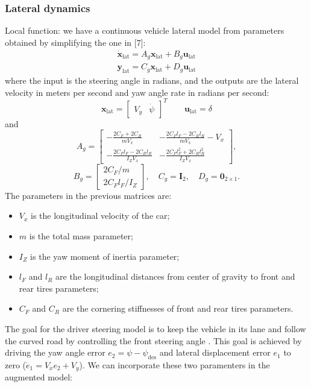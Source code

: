 \documentclass[conference, 11pt]{IEEEtran}
\begin{document}
\subsubsection{Lateral dynamics}
Local function: we have a continuous vehicle lateral model from parameters obtained by simplifying the one in [7]: 
\begin{equation}
\label{eqn:lateral_dynamics_simple_model}
\begin{array}{ll}
\dot{\textbf{x}}_{\text{lat}} =A_g \textbf{x}_{\text{lat}}+ B_g \textbf{u}_{\text{lat}}\\
\textbf{y}_{\text{lat}} =C_g \textbf{x}_{\text{lat}} + D_g \textbf{u}_{\text{lat}}
\end{array}
\end{equation}
where the input is the steering angle in radians, and the outputs are the lateral velocity in meters per second and yaw angle rate in radians per second:
\begin{equation*}
\textbf{x}_{\text{lat}} = \begin{bmatrix}
V_y&\dot{\psi}
\end{bmatrix}^T
\qquad
\textbf{u}_{\text{lat}} = \delta
\end{equation*}
and
\[ 
A_g=\begin{bmatrix}
-\frac{2C_F+2C_R}{mV_x}&-\frac{2C_Fl_F-2C_Rl_R}{mV_x} - V_x\\
-\frac{2C_Fl_F-2C_Rl_R}{I_ZV_x}&-\frac{2C_Fl_F^2+2C_Rl_R^2}{I_ZV_x}
\end{bmatrix},
\]
\[
B_g=\begin{bmatrix}
2C_F/m\\
2C_Fl_F/I_Z
\end{bmatrix},
\quad
C_g=\textbf{I}_2, 
\quad
D_g=\textbf{0}_{2\times1}.
\]
The parameters in the previous matrices are:
\begin{itemize}
	\item $V_x$ is the longitudinal velocity of the car;	
	\item $m$ is the total mass parameter; 
	\item $I_Z$ is the yaw moment of inertia parameter;
	\item $l_F$ and $l_R$ are the longitudinal distances from center of gravity to front and rear tires parameters;
	\item $C_F$ and $C_R$ are the cornering stiffnesses of front and rear tires parameters.
\end{itemize}
The goal for the driver steering model is to keep the vehicle in its lane and follow the curved road by controlling the front steering angle . This goal is achieved by driving the yaw angle error $e_2 = \psi -\psi_{\text{des}}$ and lateral displacement error $e_1$ to zero ($\dot{e}_1 = V_xe_2+V_y$). We can incorporate these two paramenters in the augmented model:
\end{document}
